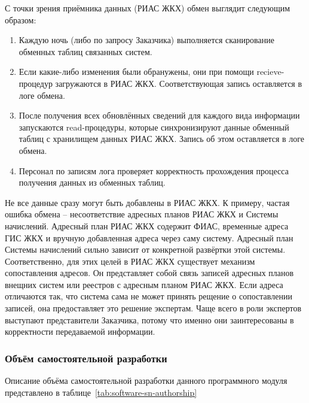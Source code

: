 С точки зрения приёмника данных (РИАС ЖКХ) обмен выглядит следующим образом:
\begin{enumerate}
	\item Каждую ночь (либо по запросу Заказчика) выполняется сканирование обменных таблиц связанных систем.
	\item Если какие-либо изменения были обранужены, они при помощи recieve-процедур загружаются в РИАС ЖКХ. Соответствующая запись оставляется в логе обмена.
	\item После получения всех обновлённых сведений для каждого вида информации запускаются read-процедуры, которые синхронизируют данные обменный таблиц с хранилищем данных РИАС ЖКХ. Запись об этом оставляется в логе обмена.
	\item Персонал по записям лога проверяет корректность прохождения процесса получения данных из обменных таблиц.
\end{enumerate}

Не все данные сразу могут быть добавлены в РИАС ЖКХ.
К примеру, частая ошибка обмена -- несоответствие адресных планов РИАС ЖКХ и Системы начислений.
Адресный план РИАС ЖКХ содержит ФИАС, временные адреса ГИС ЖКХ и вручную добавленная адреса через саму систему.
Адресный план Системы начислений сильно зависит от конкретной развёртки этой системы.
Соответственно, для этих целей в РИАС ЖКХ существует механизм сопоставления адресов.
Он представляет собой связь записей адресных планов внещних систем или реестров с адресным планом РИАС ЖКХ.
Если адреса отличаются так, что система сама не может принять рещение о сопоставлении записей, она предоставляет это решение экспертам.
Чаще всего в роли экспертов выступают представители Заказчика, потому что именно они заинтересованы в корректности передаваемой информации.

\subsubsection{Объём самостоятельной разработки}

Описание объёма самостоятельной разработки данного программного модуля представлено в таблице~\ref{tab:software-sn-authorship}

